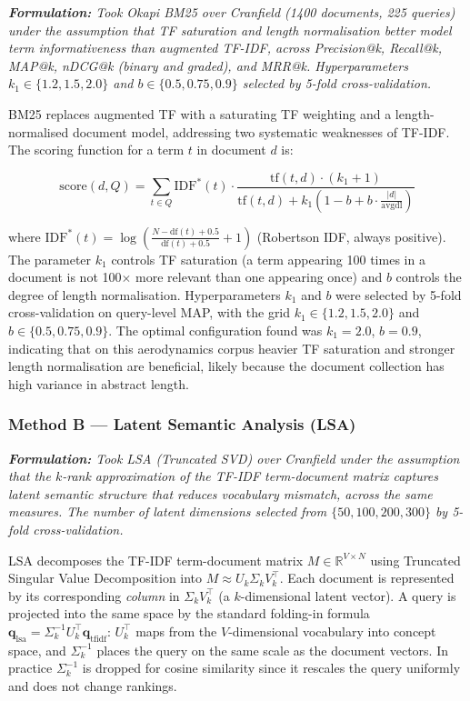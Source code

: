 \documentclass{article}
\begin{document}
\textit{\textbf{Formulation:} Took Okapi BM25 over Cranfield (1400 documents, 225 queries) under the assumption that TF saturation and length normalisation better model term informativeness than augmented TF-IDF, across Precision@k, Recall@k, MAP@k, nDCG@k (binary and graded), and MRR@k. Hyperparameters $k_1 \in \{1.2, 1.5, 2.0\}$ and $b \in \{0.5, 0.75, 0.9\}$ selected by 5-fold cross-validation.}

BM25 replaces augmented TF with a saturating TF weighting and a length-normalised document model, addressing two systematic weaknesses of TF-IDF. The scoring function for a term $t$ in document $d$ is:

\[
\mathrm{score}(d, Q) = \sum_{t \in Q} \mathrm{IDF}^*(t) \cdot \frac{\mathrm{tf}(t,d) \cdot (k_1 + 1)}{\mathrm{tf}(t,d) + k_1\!\left(1 - b + b \cdot \frac{|d|}{\mathrm{avgdl}}\right)}
\]

where $\mathrm{IDF}^*(t) = \log\!\left(\frac{N - \mathrm{df}(t) + 0.5}{\mathrm{df}(t) + 0.5} + 1\right)$ (Robertson IDF, always positive). The parameter $k_1$ controls TF saturation (a term appearing 100 times in a document is not 100$\times$ more relevant than one appearing once) and $b$ controls the degree of length normalisation. Hyperparameters $k_1$ and $b$ were selected by 5-fold cross-validation on query-level MAP, with the grid $k_1 \in \{1.2, 1.5, 2.0\}$ and $b \in \{0.5, 0.75, 0.9\}$. The optimal configuration found was $k_1{=}2.0$, $b{=}0.9$, indicating that on this aerodynamics corpus heavier TF saturation and stronger length normalisation are beneficial, likely because the document collection has high variance in abstract length.

\subsubsection{Method B --- Latent Semantic Analysis (LSA)}

\textit{\textbf{Formulation:} Took LSA (Truncated SVD) over Cranfield under the assumption that the $k$-rank approximation of the TF-IDF term-document matrix captures latent semantic structure that reduces vocabulary mismatch, across the same measures. The number of latent dimensions selected from $\{50, 100, 200, 300\}$ by 5-fold cross-validation.}

LSA decomposes the TF-IDF term-document matrix $M \in \mathbb{R}^{V \times N}$ using Truncated Singular Value Decomposition into $M \approx U_k \Sigma_k V_k^\top$. Each document is represented by its corresponding \emph{column} in $\Sigma_k V_k^\top$ (a $k$-dimensional latent vector). A query is projected into the same space by the standard folding-in formula $\mathbf{q}_{\mathrm{lsa}} = \Sigma_k^{-1} U_k^\top \mathbf{q}_{\mathrm{tfidf}}$: $U_k^\top$ maps from the $V$-dimensional vocabulary into concept space, and $\Sigma_k^{-1}$ places the query on the same scale as the document vectors. In practice $\Sigma_k^{-1}$ is dropped for cosine similarity since it rescales the query uniformly and does not change rankings.
\end{document}
